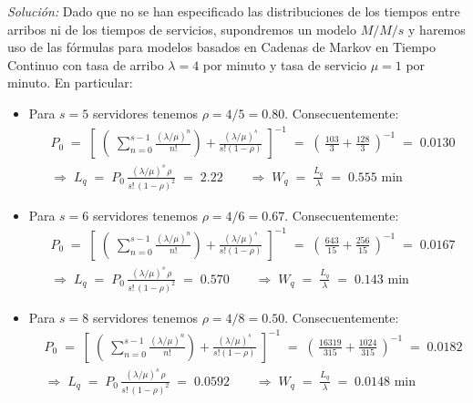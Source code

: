 \documentclass[ a4paper, twoside, 11pt]{article}
\begin{document}
\begin{problem}
\emph{Soluci\'on:} Dado que no se han especificado las distribuciones de los tiempos entre arribos ni de los tiempos de servicios, supondremos un modelo $M/M/s$ y haremos uso de las f\'ormulas para modelos basados en Cadenas de Markov en Tiempo Continuo con tasa de arribo $\lambda = 4$ por minuto y tasa de servicio $\mu = 1$ por minuto. En particular: 
\begin{itemize}
\item Para $s = 5$ servidores tenemos $\rho = 4/5 = 0.80$. Consecuentemente: 
\begin{align*}
& P_0 \; = \;
\left[ \; \left( \;
\sum_{n=0}^{s-1} \frac{(\lambda/\mu)^n}{n!} \right)
+ \frac{(\lambda/\mu)^s}{s!(1-\rho)} \; \right]^{-1} \; = \; 
\left( \, \frac{103}{3} + \frac{128}{3} \, \right)^{-1} \; = \;
0.0130 \\[2ex]
& \Longrightarrow \; L_q \; = \; 
P_0 \, \frac{(\lambda/\mu)^s \, \rho}{ s! \, (1-\rho)^2 } \; = \;
2.22 \qquad \Longrightarrow \; W_q \; = \; \frac{L_q}{\lambda} \; = \; 0.555 \text{ min}
\end{align*}
\item Para $s = 6$ servidores tenemos $\rho = 4/6 = 0.67$. Consecuentemente: 
\begin{align*}
& P_0 \; = \;
\left[ \; \left( \;
\sum_{n=0}^{s-1} \frac{(\lambda/\mu)^n}{n!} \right)
+ \frac{(\lambda/\mu)^s}{s!(1-\rho)} \; \right]^{-1} \; = \; 
\left( \, \frac{643}{15} + \frac{256}{15} \, \right)^{-1} \; = \;
0.0167 \\[2ex]
& \Longrightarrow \; L_q \; = \; 
P_0 \, \frac{(\lambda/\mu)^s \, \rho}{ s! \, (1-\rho)^2 } \; = \;
0.570 \qquad \Longrightarrow \; W_q \; = \; \frac{L_q}{\lambda} \; = \; 0.143 \text{ min}
\end{align*}
\item Para $s = 8$ servidores tenemos $\rho = 4/8 = 0.50$. Consecuentemente: 
\begin{align*}
& P_0 \; = \;
\left[ \; \left( \;
\sum_{n=0}^{s-1} \frac{(\lambda/\mu)^n}{n!} \right)
+ \frac{(\lambda/\mu)^s}{s!(1-\rho)} \; \right]^{-1} \; = \; 
\left( \, \frac{16319}{315} + \frac{1024}{315} \, \right)^{-1} \; = \;
0.0182 \\[2ex]
& \Longrightarrow \; L_q \; = \; 
P_0 \, \frac{(\lambda/\mu)^s \, \rho}{ s! \, (1-\rho)^2 } \; = \;
0.0592 \qquad \Longrightarrow \; W_q \; = \; \frac{L_q}{\lambda} \; = \; 0.0148 \text{ min}
\end{align*}

\end{itemize}


\end{problem}
\vspace{\baselineskip}
\end{document}
